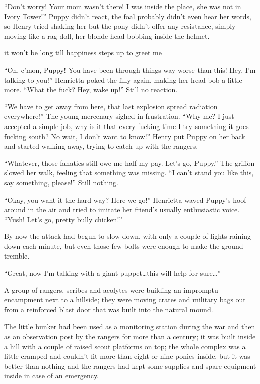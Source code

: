 ``Don't worry! Your mom wasn't there! I was inside the place, she was not in Ivory Tower!'' Puppy didn't react, the foal probably didn't even hear her words, so Henry tried shaking her but the pony didn't offer any resistance, simply moving like a rag doll, her blonde head bobbing inside the helmet.


\begin{song}
    it won't be long till happiness steps up to greet me
\end{song}

``Oh, c'mon, Puppy! You have been through things way worse than this! Hey, I'm talking to you!'' Henrietta poked the filly again, making her head bob a little more. ``What the fuck? Hey, wake up!'' Still no reaction.

``We have to get away from here, that last explosion spread radiation everywhere!'' The young mercenary sighed in frustration. ``Why me? I just accepted a simple job, why is it that every fucking time I try something it goes fucking south? No wait, I don't want to know!'' Henry put Puppy on her back and started walking away, trying to catch up with the rangers.

``Whatever, those fanatics still owe me half my pay. Let's go, Puppy.'' The griffon slowed her walk, feeling that something was missing. ``I can't stand you like this, say something, please!'' Still nothing.

``Okay, you want it the hard way? Here we go!'' Henrietta waved Puppy's hoof around in the air and tried to imitate her friend's usually enthusiastic voice. ``Yush! Let's go, pretty bully chicken!''

By now the attack had begun to slow down, with only a couple of lights raining down each minute, but even those few bolts were enough to make the ground tremble.

``Great, now I'm talking with a giant puppet\dots this will help for sure\dots''

\horizonline


A group of rangers, scribes and acolytes were building an impromptu encampment next to a hillside; they were moving crates and military bags out from a reinforced blast door that was built into the natural mound.

The little bunker had been used as a monitoring station during the war and then as an observation post by the rangers for more than a century; it was built inside a hill with a couple of raised scout platforms on top; the whole complex was a little cramped and couldn't fit more than eight or nine ponies inside, but it was better than nothing and the rangers had kept some supplies and spare equipment inside in case of an emergency.

